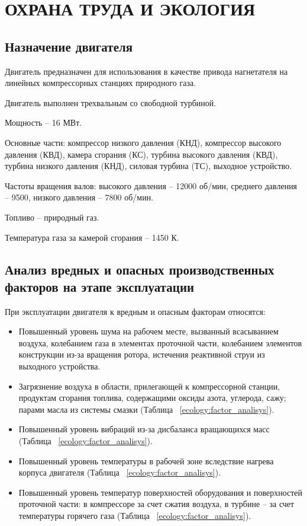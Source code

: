 \section{ОХРАНА ТРУДА И ЭКОЛОГИЯ}
\label{sec:ecology}

\subsection{Назначение двигателя}
\label{sub:ecology_engine_purpose}

Двигатель предназначен для использования в качестве привода нагнетателя на линейных компрессорных станциях природного газа.

Двигатель выполнен трехвальным со свободной турбиной.

Мощность – 16 МВт.

Основные части: компрессор низкого давления (КНД), компрессор высокого давления (КВД), камера сгорания (КС), турбина высокого давления (КВД), турбина низкого давления (КНД), силовая турбина (ТС), выходное устройство.

Частоты вращения валов: высокого давления – 12000 об/мин, среднего давления – 9500, низкого давления – 7800 об/мин.

Топливо – природный газ.

Температура газа за камерой сгорания – 1450 К.

\subsection{Анализ вредных и опасных производственных факторов на этапе эксплуатации} %
\label{sub:ecology_factor_analisys}

При эксплуатации двигателя к вредным и опасным факторам относятся:
\begin{itemize}
	\item Повышенный уровень шума на рабочем месте, вызванный всасыванием воздуха, колебанием газа в элементах проточной части, колебанием элементов конструкции из-за вращения ротора, истечения реактивной струи из выходного устройства.
	\item Загрязнение воздуха в области, прилегающей к компрессорной станции, продуктам сгорания топлива, содержащими оксиды азота, углерода, сажу; парами масла из системы смазки (Таблица ~\ref{ecology:factor_analisys}).
	\item Повышенный уровень вибраций из-за дисбаланса вращающихся масс (Таблица ~\ref{ecology:factor_analisys}).
	\item Повышенный уровень температуры в рабочей зоне вследствие нагрева корпуса двигателя (Таблица ~\ref{ecology:factor_analisys}).
	\item Повышенный уровень температур поверхностей оборудования и поверхностей проточной части: в компрессоре за счет сжатия воздуха, в турбине – за счет температуры горячего газа (Таблица ~\ref{ecology:factor_analisys}).
\end{itemize}

